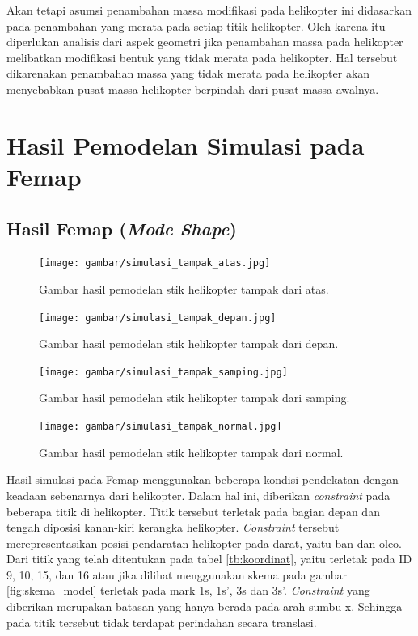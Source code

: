 Akan tetapi asumsi penambahan massa modifikasi pada helikopter ini didasarkan pada penambahan yang merata pada setiap titik helikopter. Oleh karena itu diperlukan analisis dari aspek geometri jika penambahan massa pada helikopter melibatkan modifikasi bentuk yang tidak merata pada helikopter. Hal tersebut dikarenakan penambahan massa yang tidak merata pada helikopter akan menyebabkan pusat massa helikopter berpindah dari pusat massa awalnya. 


\section{Hasil Pemodelan Simulasi pada Femap}

\subsection{Hasil Femap (\textit{Mode Shape})}



\begin{figure}[H]
	\centering
	\texttt{[image: gambar/simulasi\_tampak\_atas.jpg]}
	\caption{Gambar hasil pemodelan stik helikopter tampak dari atas.}
	\label{fig:simulasi_tampak_atas}
\end{figure}

\begin{figure}[H]
	\centering
	\texttt{[image: gambar/simulasi\_tampak\_depan.jpg]}
	\caption{Gambar hasil pemodelan stik helikopter tampak dari depan.}
	\label{fig:simulasi_tampak_depan}
\end{figure}

\begin{figure}[H]
	\centering
	\texttt{[image: gambar/simulasi\_tampak\_samping.jpg]}
	\caption{Gambar hasil pemodelan stik helikopter tampak dari samping.}
	\label{fig:simulasi_tampak_samping}
\end{figure}

\begin{figure}[H]
	\centering
	\texttt{[image: gambar/simulasi\_tampak\_normal.jpg]}
	\caption{Gambar hasil pemodelan stik helikopter tampak dari normal.}
	\label{fig:simulasi_tampak_normal}
\end{figure}

Hasil simulasi pada Femap menggunakan beberapa kondisi pendekatan dengan keadaan sebenarnya dari helikopter. Dalam hal ini, diberikan \textit{constraint} pada beberapa titik di helikopter. Titik tersebut terletak pada bagian depan dan tengah diposisi kanan-kiri kerangka helikopter. \textit{Constraint} tersebut merepresentasikan posisi pendaratan helikopter pada darat, yaitu ban dan oleo. Dari titik yang telah ditentukan pada tabel \ref{tb:koordinat}, yaitu terletak pada ID 9, 10, 15, dan 16 atau jika dilihat menggunakan skema pada gambar \ref{fig:skema_model} terletak pada mark 1s, 1s', 3s dan 3s'. \textit{Constraint} yang diberikan merupakan batasan yang hanya berada pada arah sumbu-x. Sehingga pada titik tersebut tidak terdapat perindahan secara translasi.

